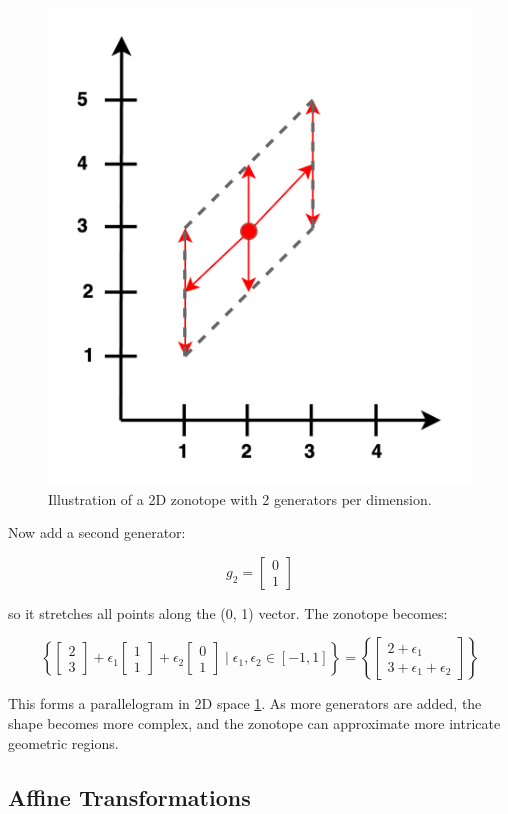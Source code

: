 \documentclass[oneside,11pt,dvipsnames]{book}
\begin{document}
\begin{figure}[h]
    \centering
    \includegraphics[width=0.5\linewidth]{2-generator-zonotope.png}
    \caption{Illustration of a 2D zonotope with 2 generators per dimension.}
    \label{fig:2d2g-zonotope}
\end{figure}


Now add a second generator:

\[
g_2 = \begin{bmatrix}0 \\ 1\end{bmatrix} 
\]

so it stretches all points along the (0, 1) vector.
The zonotope becomes:

\[
\left\{
\begin{bmatrix}2 \\ 3\end{bmatrix} + \epsilon_1 \begin{bmatrix}1 \\ 1\end{bmatrix} + \epsilon_2 \begin{bmatrix}0 \\ 1\end{bmatrix}
\mid \epsilon_1, \epsilon_2 \in [-1, 1]
\right\}
= \left\{
\begin{bmatrix}2 + \epsilon_1 \\ 3 + \epsilon_1 + \epsilon_2\end{bmatrix}
\right\}
\]


This forms a parallelogram in 2D space \ref{fig:2d2g-zonotope}. As more generators are added, the shape becomes more complex, and the zonotope can approximate more intricate geometric regions.

\subsection{Affine Transformations}
\end{document}
